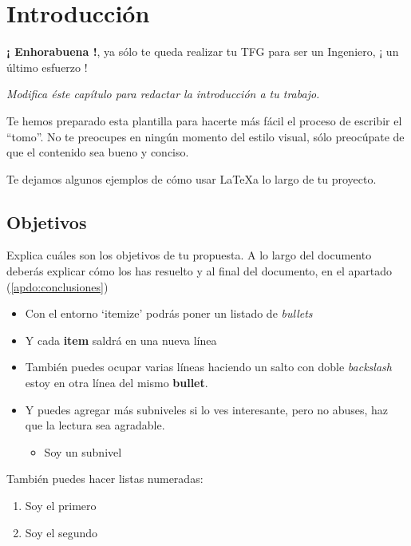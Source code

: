 
\chapter{Introducción}

\textbf{¡ Enhorabuena !}, ya sólo te queda realizar tu TFG para ser un Ingeniero, ¡ un último esfuerzo !

\textit{Modifica éste capítulo para redactar la introducción a tu trabajo.}

Te hemos preparado esta plantilla para hacerte más fácil el proceso de escribir el ``tomo''. No te preocupes en ningún momento del estilo visual, sólo preocúpate de que el contenido sea bueno y conciso.

Te dejamos algunos ejemplos de cómo usar \LaTeX a lo largo de tu proyecto.

\section{Objetivos}

Explica cuáles son los objetivos de tu propuesta. A lo largo del documento deberás explicar cómo los has resuelto y al final del documento, en el apartado   (\ref{apdo:conclusiones})

\begin{itemize}
    \item Con el entorno `itemize' podrás poner un listado de \textit{bullets}
    \item Y cada \textbf{item} saldrá en una nueva línea
    \item También puedes ocupar varias líneas haciendo un salto con doble \textit{backslash} \\
        estoy en otra línea del mismo \textbf{bullet}.
    \item Y puedes agregar más subniveles si lo ves interesante, pero no abuses, haz que la lectura sea agradable.
    \begin{itemize}
        \item Soy un subnivel
    \end{itemize}
\end{itemize}

También puedes hacer listas numeradas:

\begin{enumerate}
    \item Soy el primero
    \item Soy el segundo
\end{enumerate}
